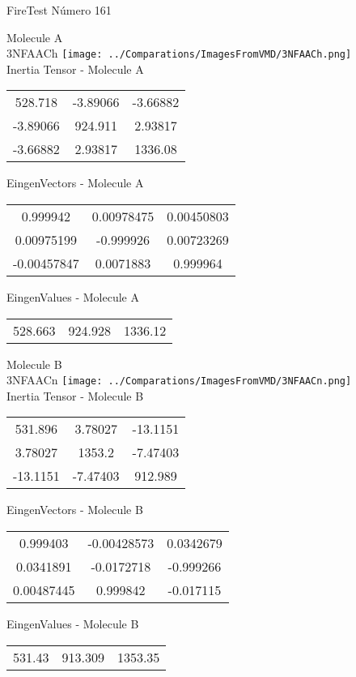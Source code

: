 \vtab[-2cm]
\begin{center}
{\large FireTest \tab Número 161}
\end{center}
\begin{multicols}{2}
\begin{center}

Molecule A \\ 
3NFAACh
\texttt{[image: ../Comparations/ImagesFromVMD/3NFAACh.png]}
\\
Inertia Tensor - Molecule A \\
\vtab

\begin{tabular}{|c c c|}
528.718	 & 	-3.89066	 & 	-3.66882	 \\
-3.89066	 & 	924.911	 & 	2.93817	 \\
-3.66882	 & 	2.93817	 & 	1336.08
\end{tabular}

\vtab
 EingenVectors - Molecule A     \\
\vtab
\begin{tabular}{|c c c|}
0.999942	 & 	0.00978475	 & 	0.00450803	 \\
0.00975199	 & 	-0.999926	 & 	0.00723269	 \\
-0.00457847	 & 	0.0071883	 & 	0.999964
\end{tabular}

\vtab
 EingenValues - Molecule A     \\
\vtab
\begin{tabular}{|c c c|}
528.663	 & 	924.928	 & 	1336.12	 \\
\end{tabular}
\columnbreak

Molecule B \\ 
3NFAACn
\texttt{[image: ../Comparations/ImagesFromVMD/3NFAACn.png]}
\\
Inertia Tensor - Molecule B \\
\vtab

\begin{tabular}{|c c c|}
531.896	 & 	3.78027	 & 	-13.1151	 \\
3.78027	 & 	1353.2	 & 	-7.47403	 \\
-13.1151	 & 	-7.47403	 & 	912.989
\end{tabular}

\vtab
 EingenVectors - Molecule B     \\
\vtab
\begin{tabular}{|c c c|}
0.999403	 & 	-0.00428573	 & 	0.0342679	 \\
0.0341891	 & 	-0.0172718	 & 	-0.999266	 \\
0.00487445	 & 	0.999842	 & 	-0.017115
\end{tabular}

\vtab
 EingenValues - Molecule B     \\
\vtab
\begin{tabular}{|c c c|}
531.43	 & 	913.309	 & 	1353.35	 \\
\end{tabular}

\end{center}
\end{multicols}
